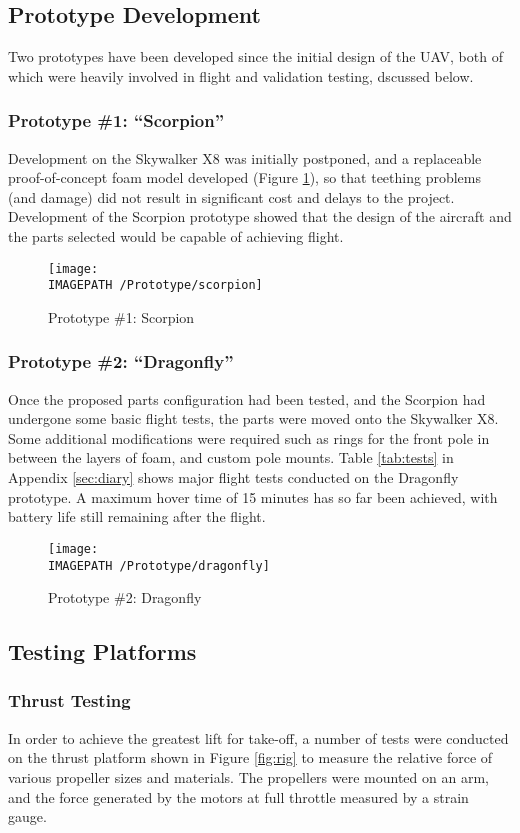 \subsection{Prototype Development}
Two prototypes have been developed since the initial design of the UAV, both of which were heavily involved in flight and validation testing, dscussed below.

\subsubsection*{Prototype \#1: ``Scorpion''}
Development on the Skywalker X8 was initially postponed, and a replaceable proof-of-concept foam model developed (Figure \ref{fig:scorpion}), so that teething problems (and damage) did not result in significant cost and delays to the project. Development of the Scorpion prototype showed that the design of the aircraft and the parts selected would be capable of achieving flight.

\begin{figure}[!ht]
	\centering
	\texttt{[image: \\IMAGEPATH /Prototype/scorpion]}
	\caption{Prototype \#1: Scorpion }
	\label{fig:scorpion}
\end{figure}

\subsubsection*{Prototype \#2: ``Dragonfly''}
Once the proposed parts configuration had been tested, and the Scorpion had undergone some basic flight tests, the parts were moved onto the Skywalker X8. Some additional modifications were required such as rings for the front pole in between the layers of foam, and custom pole mounts. Table \ref{tab:tests} in Appendix \ref{sec:diary} shows major flight tests conducted on the Dragonfly prototype. A maximum hover time of 15 minutes has so far been achieved, with battery life still remaining after the flight.  

\begin{figure}[!ht]
	\centering
	\texttt{[image: \\IMAGEPATH /Prototype/dragonfly]}
	\caption{Prototype \#2: Dragonfly }
	\label{fig:dragonfly}
\end{figure}

\subsection{Testing Platforms}
\subsubsection*{Thrust Testing}
In order to achieve the greatest lift for take-off, a number of tests were conducted on the thrust platform shown in Figure \ref{fig:rig} to measure the relative force of various propeller sizes and materials. The propellers were mounted on an arm, and the force generated by the motors at full throttle measured by a strain gauge.\\


